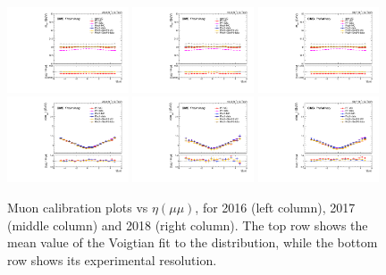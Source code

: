 \begin{figure}[!htb]
      \centering
      \captionsetup{justification=justified}
      \includegraphics[width=0.32\textwidth]{pics/muon_corr/muon_cal/2016/dimu_eta_summary_mean.pdf}
      \includegraphics[width=0.32\textwidth]{pics/muon_corr/muon_cal/2017/dimu_eta_summary_mean.pdf}
      \includegraphics[width=0.32\textwidth]{pics/muon_corr/muon_cal/2018/dimu_eta_summary_mean.pdf}
      \includegraphics[width=0.32\textwidth]{pics/muon_corr/muon_cal/2016/dimu_eta_summary_reso.pdf}
      \includegraphics[width=0.32\textwidth]{pics/muon_corr/muon_cal/2017/dimu_eta_summary_reso.pdf}
      \includegraphics[width=0.32\textwidth]{pics/muon_corr/muon_cal/2018/dimu_eta_summary_reso.pdf}
      \caption{Muon calibration plots vs $\eta(\mu\mu)$, for 2016 (left column), 2017 (middle column) and 2018 (right column).
               The top row shows the mean value of the Voigtian fit to the \mmm distribution, 
               while the bottom row shows its experimental resolution.}
      \label{fig:mucal_dimu_eta}
\end{figure}


